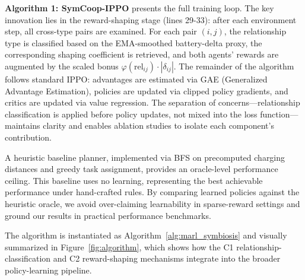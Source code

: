 \documentclass[Afour,sageh,times]{sagej}
\begin{document}
\textbf{Algorithm 1: SymCoop-IPPO} presents the full training loop. The key innovation lies in the reward-shaping stage (lines 29-33): after each environment step, all cross-type pairs are examined. For each pair $(i, j)$, the relationship type is classified based on the EMA-smoothed battery-delta proxy, the corresponding shaping coefficient is retrieved, and both agents' rewards are augmented by the scaled bonus $\varphi(\mathrm{rel}_{ij}) \cdot |\delta_{ij}|$. The remainder of the algorithm follows standard IPPO: advantages are estimated via GAE (Generalized Advantage Estimation), policies are updated via clipped policy gradients, and critics are updated via value regression. The separation of concerns---relationship classification is applied before policy updates, not mixed into the loss function---maintains clarity and enables ablation studies to isolate each component's contribution.

A heuristic baseline planner, implemented via BFS on precomputed charging distances and greedy task assignment, provides an oracle-level performance ceiling. This baseline uses no learning, representing the best achievable performance under hand-crafted rules. By comparing learned policies against the heuristic oracle, we avoid over-claiming learnability in sparse-reward settings and ground our results in practical performance benchmarks.

The algorithm is instantiated as Algorithm~\ref{alg:marl_symbiosis} and visually summarized in Figure~\ref{fig:algorithm}, which shows how the C1 relationship-classification and C2 reward-shaping mechanisms integrate into the broader policy-learning pipeline.
\end{document}
